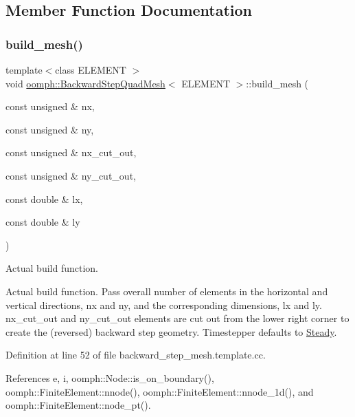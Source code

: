 \subsection{Member Function Documentation}
\mbox{\label{classoomph_1_1BackwardStepQuadMesh_ab71a6f2854d36b845ed79dccb0101991}} 
\subsubsection{\texorpdfstring{build\+\_\+mesh()}{build\_mesh()}}
{\footnotesize\ttfamily template$<$class E\+L\+E\+M\+E\+NT $>$ \\
void \hyperlink{classoomph_1_1BackwardStepQuadMesh}{oomph\+::\+Backward\+Step\+Quad\+Mesh}$<$ E\+L\+E\+M\+E\+NT $>$\+::build\+\_\+mesh (\begin{DoxyParamCaption}\item[{const unsigned \&}]{nx,  }\item[{const unsigned \&}]{ny,  }\item[{const unsigned \&}]{nx\+\_\+cut\+\_\+out,  }\item[{const unsigned \&}]{ny\+\_\+cut\+\_\+out,  }\item[{const double \&}]{lx,  }\item[{const double \&}]{ly }\end{DoxyParamCaption})\hspace{0.3cm}{\ttfamily [private]}}



Actual build function. 

Actual build function. Pass overall number of elements in the horizontal and vertical directions, nx and ny, and the corresponding dimensions, lx and ly. nx\+\_\+cut\+\_\+out and ny\+\_\+cut\+\_\+out elements are cut out from the lower right corner to create the (reversed) backward step geometry. Timestepper defaults to \hyperlink{classoomph_1_1Steady}{Steady}. 

Definition at line 52 of file backward\+\_\+step\+\_\+mesh.\+template.\+cc.



References e, i, oomph\+::\+Node\+::is\+\_\+on\+\_\+boundary(), oomph\+::\+Finite\+Element\+::nnode(), oomph\+::\+Finite\+Element\+::nnode\+\_\+1d(), and oomph\+::\+Finite\+Element\+::node\+\_\+pt().



